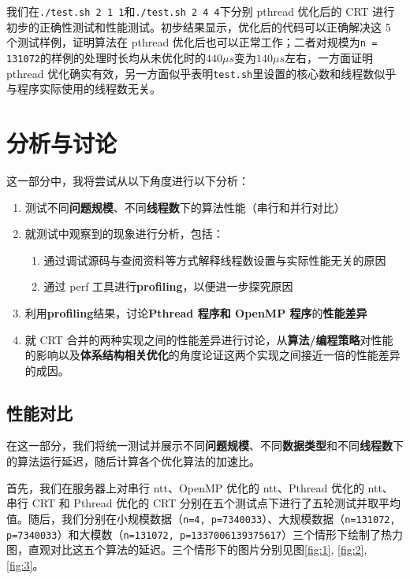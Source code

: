 \documentclass[a4paper]{article}
\begin{document}
我们在\texttt{./test.sh 2 1 1}和\texttt{./test.sh 2 4 4}下分别 pthread 优化后的 CRT 进行初步的正确性测试和性能测试。初步结果显示，优化后的代码可以正确解决这 5 个测试样例，证明算法在 pthread 优化后也可以正常工作；二者对规模为\texttt{n = 131072}的样例的处理时长均从未优化时的$440 \mu s$变为$140 \mu s$左右，一方面证明 pthread 优化确实有效，另一方面似乎表明\texttt{test.sh}里设置的核心数和线程数似乎与程序实际使用的线程数无关。

\section{分析与讨论}\label{sec:analysis}

这一部分中，我将尝试从以下角度进行以下分析：

\begin{enumerate}
\item 测试不同\textbf{问题规模}、不同\textbf{线程数}下的算法性能（串行和并行对比）
\item 就测试中观察到的现象进行分析，包括：
   \begin{enumerate}
   \item 通过调试源码与查阅资料等方式解释线程数设置与实际性能无关的原因
   \item 通过 perf 工具进行\textbf{profiling}，以便进一步探究原因
   \end{enumerate}
\item 利用\textbf{profiling}结果，讨论\textbf{Pthread 程序和 OpenMP 程序}的\textbf{性能差异}
\item 就 CRT 合并的两种实现之间的性能差异进行讨论，从\textbf{算法/编程策略}对性能的影响以及\textbf{体系结构相关优化}的角度论证这两个实现之间接近一倍的性能差异的成因。
\end{enumerate}

\subsection{性能对比}

在这一部分，我们将统一测试并展示不同\textbf{问题规模}、不同\textbf{数据类型}和不同\textbf{线程数}下的算法运行延迟，随后计算各个优化算法的加速比。

首先，我们在服务器上对串行 ntt、OpenMP 优化的 ntt、Pthread 优化的 ntt、串行 CRT 和 Pthread 优化的 CRT 分别在五个测试点下进行了五轮测试并取平均值。随后，我们分别在小规模数据（\texttt{n=4, p=7340033}）、大规模数据（\texttt{n=131072, p=7340033}）和大模数（\texttt{n=131072, p=1337006139375617}）三个情形下绘制了热力图，直观对比这五个算法的延迟。三个情形下的图片分别见图\ref{fig:1}, \ref{fig:2}, \ref{fig:3}。
\end{document}
